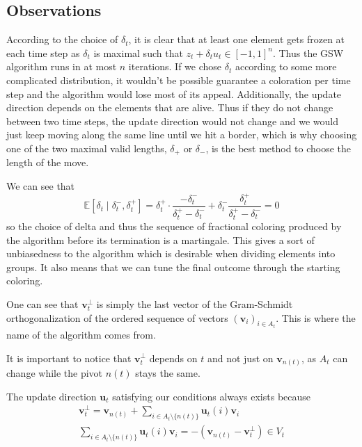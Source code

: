 \documentclass[12pt]{article}
\begin{document}

\subsection{Observations}
According to the choice of $\delta_t$, it is clear that at least one element gets frozen at each time step as $\delta_t$ is maximal such that $z_t+\delta_tu_t\in[-1,1]^n$. Thus the GSW algorithm runs in at most $n$ iterations. If we chose $\delta_t$ according to some more complicated distribution, it wouldn't be possible guarantee a coloration per time step and the algorithm would lose most of its appeal. Additionally, the update direction depends on the elements that are alive. Thus if they do not change between two time steps, the update direction would not change and we would just keep moving along the same line until we hit a border, which is why choosing one of the two maximal valid lengths, $\delta_+$ or $\delta_-$, is the best method to choose the length of the move.

We can see that
$$\mathbb{E}[\delta_t \mid \delta_t^-, \delta_t^+] = \delta_t^+ \cdot \frac{-\delta_t^-}{\delta_t^+-\delta_t^-} + \delta_t^- \frac{\delta_t^+}{\delta_t^+-\delta_t^-} =0$$
so the choice of delta and thus the sequence of fractional coloring produced by the algorithm before its termination is a martingale. This gives a sort of unbiasedness to the algorithm which is desirable when dividing elements into groups. It also means that we can tune the final outcome through the starting coloring.

One can see that $\textbf{v}^\perp _t$ is simply the last vector of the Gram-Schmidt orthogonalization of the ordered sequence of vectors $(\textbf{v}_i)_{i\in A_t}$. This is where the name of the algorithm comes from.

It is important to notice that $\textbf{v}^{\perp}_t$ depends on $t$ and not just on $\textbf{v}_{n(t)}$, as $A_t$ can change while the pivot $n(t)$ stays the same.

The update direction $\textbf{u}_t$ satisfying our conditions always exists because
\begin{align*}
        \textbf{v}^\perp_t = \textbf{v}_{n(t)} + \sum_{i \in A_t \setminus \{n(t)\}} \textbf{u}_t(i)\textbf{v}_i\\
        \sum_{i \in A_t \setminus \{n(t)\}} \textbf{u}_t(i)\textbf{v}_i = -(\textbf{v}_{n(t)} - \textbf{v}^\perp_t) \in V_t
\end{align*}
\end{document}
